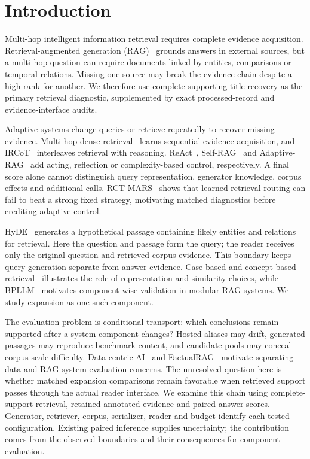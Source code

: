 \section{Introduction}
\label{sec:introduction}

Multi-hop intelligent information retrieval requires complete evidence acquisition. Retrieval-augmented generation (RAG)~\cite{lewis2020rag} grounds answers in external sources, but a multi-hop question can require documents linked by entities, comparisons or temporal relations. Missing one source may break the evidence chain despite a high rank for another. We therefore use complete supporting-title recovery as the primary retrieval diagnostic, supplemented by exact processed-record and evidence-interface audits.

Adaptive systems change queries or retrieve repeatedly to recover missing evidence. Multi-hop dense retrieval~\cite{xiong2021multihopdense} learns sequential evidence acquisition, and IRCoT~\cite{trivedi2022ircot} interleaves retrieval with reasoning. ReAct~\cite{yao2022react}, Self-RAG~\cite{asai2023selfrag} and Adaptive-RAG~\cite{jeong2024adaptiverag} add acting, reflection or complexity-based control, respectively. A final score alone cannot distinguish query representation, generator knowledge, corpus effects and additional calls. RCT-MARS~\cite{srivastava2026rctmars} shows that learned retrieval routing can fail to beat a strong fixed strategy, motivating matched diagnostics before crediting adaptive control.

HyDE~\cite{gao2022hyde} generates a hypothetical passage containing likely entities and relations for retrieval. Here the question and passage form the query; the reader receives only the original question and retrieved corpus evidence. This boundary keeps query generation separate from answer evidence. Case-based and concept-based retrieval~\cite{nasar2024retrieval} illustrates the role of representation and similarity choices, while BPLLM~\cite{bernardi2024bpllm} motivates component-wise validation in modular RAG systems. We study expansion as one such component.

The evaluation problem is conditional transport: which conclusions remain supported after a system component changes? Hosted aliases may drift, generated passages may reproduce benchmark content, and candidate pools may conceal corpus-scale difficulty. Data-centric AI~\cite{malerba2024datacentric} and FactualRAG~\cite{chang2026factualrag} motivate separating data and RAG-system evaluation concerns. The unresolved question here is whether matched expansion comparisons remain favorable when retrieved support passes through the actual reader interface. We examine this chain using complete-support retrieval, retained annotated evidence and paired answer scores. Generator, retriever, corpus, serializer, reader and budget identify each tested configuration. Existing paired inference supplies uncertainty; the contribution comes from the observed boundaries and their consequences for component evaluation.

